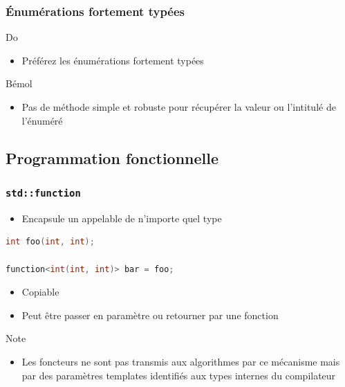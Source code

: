 \documentclass[C++.tex]{subfiles}
\begin{document}
\begin{frame}[fragile]
	\frametitle{Énumérations fortement typées}
	\begin{exampleblock}{Do}
		\begin{itemize}
			\item Préférez les énumérations fortement typées
		\end{itemize}
	\end{exampleblock}

	\begin{block}{Bémol}
		\begin{itemize}
			\item Pas de méthode simple et robuste pour récupérer la valeur ou l'intitulé de l'énuméré
		\end{itemize}

	\end{block}
\end{frame}

\subsection*{Programmation fonctionnelle}
\begin{frame}[fragile]
	\frametitle{\lstinline|std::function|}

	\begin{itemize}
		\item Encapsule un appelable de n'importe quel type
	\end{itemize}

	\begin{lstlisting}[language=C++]
int foo(int, int);

function<int(int, int)> bar = foo;\end{lstlisting}

	\begin{itemize}
		\item Copiable
		\item Peut être passer en paramètre ou retourner par une fonction
	\end{itemize}

	\begin{block}{Note}
		\begin{itemize}
			\item Les foncteurs ne sont pas transmis aux algorithmes par ce mécanisme mais par des paramètres templates identifiés aux types internes du compilateur
		\end{itemize}
	
	\end{block}
\end{frame}
\end{document}

